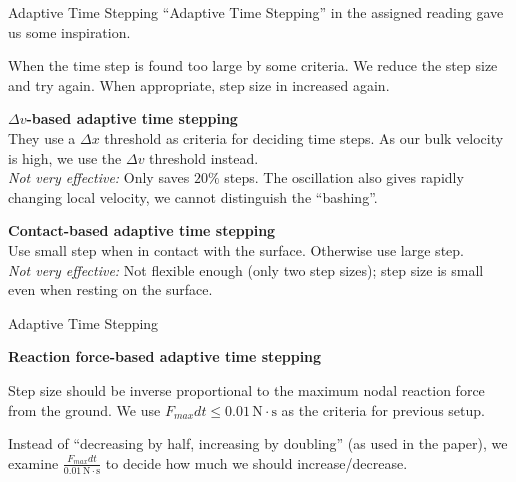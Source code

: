 \documentclass{beamer}
\newlength{\currentparskip}
\newenvironment{minipageparskip}[1]{\setlength{\currentparskip}{\parskip}\begin{minipage}{#1}\setlength{\parskip}{\currentparskip}}{\end{minipage}}
\begin{document}
	\begin{frame}{Adaptive Time Stepping}
		\small
		``Adaptive Time Stepping'' in the assigned reading gave us some inspiration.
		
		When the time step is found too large by some criteria. We reduce the step size and try again. When appropriate, step size in increased again.
		
		\textbf{$\Delta v$-based adaptive time stepping}\\
		They use a $\Delta x$ threshold as criteria for deciding time steps. As our bulk velocity is high, we use the $\Delta v$ threshold instead.\\
		\textit{Not very effective:} Only saves $20\%$ steps. The oscillation also gives rapidly changing local velocity, we cannot distinguish the ``bashing''. 
		
		\textbf{Contact-based adaptive time stepping}\\
		Use small step when in contact with the surface. Otherwise use large step.\\
		\textit{Not very effective:} Not flexible enough (only two step sizes); step size is small even when resting on the surface.
	\end{frame}
	\begin{frame}{Adaptive Time Stepping}
		\begin{minipageparskip}{0.45\textwidth}
			\small
			\textbf{Reaction force-based adaptive time stepping}
			
			Step size should be inverse proportional to the maximum nodal reaction force from the ground.
		We use $F_{max}dt \leq 0.01\,\mathrm{N\cdot s}$ as the criteria for previous setup.
		
			Instead of ``decreasing by half, increasing by doubling'' (as used in the paper), we examine $\frac{F_{max}dt}{0.01\,\mathrm{N\cdot s}}$ to decide how much we should increase/decrease.
		\end{minipageparskip}%
		\hspace{0.05\textwidth}%
		\begin{minipageparskip}{0.5\textwidth}
			\tiny
			\hfill
			
			\hfill
		\end{minipageparskip}
	\end{frame}
\end{document}
